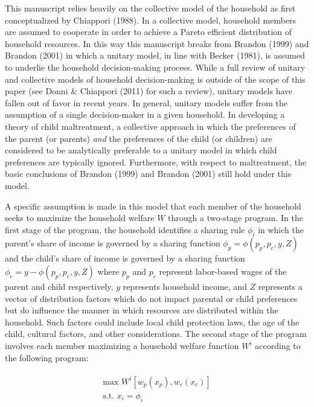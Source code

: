 \documentclass[review]{elsarticle}\usepackage[]{graphicx}\usepackage[]{color}
\begin{document}
This manuscript relies heavily on the collective model of the household
as first conceptualized by Chiappori (1988). In a collective
model, household members are assumed to cooperate in order to achieve a
Pareto efficient distribution of household resources. In this way this
manuscript breaks from Brandon (1999) and Brandon (2001) in which a
unitary model, in line with Becker (1981), is assumed to underlie
the household decision-making process. While a full review of unitary
and collective models of household decision-making is outside of the
scope of this paper (see Donni \& Chiappori (2011) for such a review),
unitary models have fallen out of favor in recent years. In general,
unitary models suffer from the assumption of a single decision-maker in
a given household. In developing a theory of child maltreatment, a
collective approach in which the preferences of the parent (or parents)
\emph{and} the preferences of the child (or children) are considered to
be analytically preferable to a unitary model in which child preferences
are typically ignored. Furthermore, with respect to maltreatment, the
basic conclusions of Brandon (1999) and Brandon (2001) still hold under
this model.

A specific assumption is made in this model that each member of the
household seeks to maximize the household welfare $W$ through a
two-stage program. In the first stage of the program, the household
identifies a sharing rule $\phi_i$ in which the parent's share of income
is governed by a sharing function $\phi_p=\phi(p_p, p_c, y, Z)$ and the
child's share of income is governed by a sharing function
$\phi_c=y-\phi(p_p, p_c, y, Z)$ where $p_p$ and $p_c$ represent
labor-based wages of the parent and child respectively, $y$ represents
household income, and $Z$ represents a vector of distribution factors
which do not impact parental or child preferences but do influence the
manner in which resources are distributed within the household. Such
factors could include local child protection laws, the age of the child,
cultural factors, and other considerations. The second stage of the
program involves each member maximizing a household welfare function
$W^i$ according to the following program:

\begin{align}\label{eqn:stage2}
\begin{split}
\text{max } W^i[w_p(x_p), w_c(x_c)]\\
\text{s.t. } x_i = \phi_i
\end{split}
\end{align}
\end{document}
